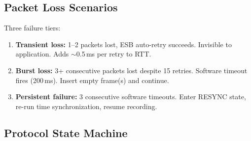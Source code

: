 \documentclass[11pt,a4paper]{article}
\begin{document}
\subsection{Packet Loss Scenarios}

Three failure tiers:

\begin{enumerate}
  \item \textbf{Transient loss:} 1--2 packets lost, ESB auto-retry succeeds. Invisible to application. Adds ${\sim}$0.5\,ms per retry to RTT.
  \item \textbf{Burst loss:} 3+ consecutive packets lost despite 15 retries. Software timeout fires (200\,ms). Insert empty frame(s) and continue.
  \item \textbf{Persistent failure:} 3 consecutive software timeouts. Enter RESYNC state, re-run time synchronization, resume recording.
\end{enumerate}

\subsection{Protocol State Machine}
\end{document}
